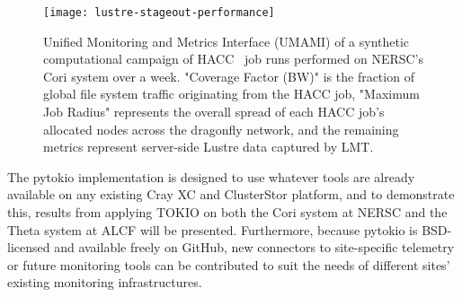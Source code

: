 \begin{figure}[t]
    \centering
    \texttt{[image: lustre-stageout-performance]}
    \vspace{-.3in}
    \caption{Unified Monitoring and Metrics Interface (UMAMI) of a synthetic computational campaign of HACC~\cite{Habib2012} job runs performed on NERSC's Cori system over a week.  "Coverage Factor (BW)" is the fraction of global file system traffic originating from the HACC job, "Maximum Job Radius" represents the overall spread of each HACC job's allocated nodes across the dragonfly network, and the remaining metrics represent server-side Lustre data captured by LMT.}
    \label{fig:lustre-heatmap}
    \vspace{-.2in}
\end{figure}

The pytokio implementation is designed to use whatever tools are already available on any existing Cray XC and ClusterStor platform, and to demonstrate this, results from applying TOKIO on both the Cori system at NERSC and the Theta system at ALCF will be presented.  Furthermore, because pytokio is BSD-licensed and available freely on GitHub, new connectors to site-specific telemetry or future monitoring tools can be contributed to suit the needs of different sites' existing monitoring infrastructures.



